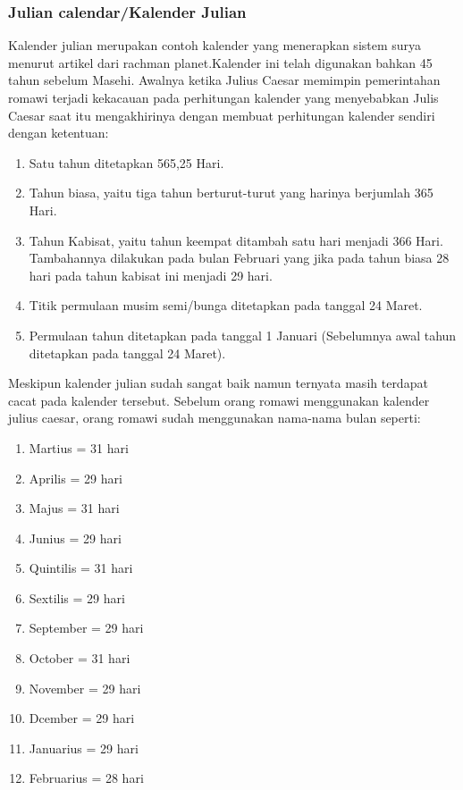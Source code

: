     \subsubsection{Julian calendar/Kalender Julian}
      Kalender julian merupakan contoh kalender yang menerapkan sistem surya menurut artikel dari rachman planet\cite{rachmanplanet}.Kalender ini telah digunakan bahkan 45 tahun sebelum Masehi.
    Awalnya ketika Julius Caesar memimpin pemerintahan romawi terjadi kekacauan  pada perhitungan kalender yang menyebabkan Julis Caesar saat itu mengakhirinya dengan membuat perhitungan kalender sendiri dengan ketentuan:
    \begin{enumerate}
	  \item Satu tahun ditetapkan 565,25 Hari.
      \item Tahun biasa, yaitu tiga tahun berturut-turut yang harinya berjumlah 365 Hari.
      \item Tahun Kabisat, yaitu tahun keempat ditambah satu hari menjadi 366 Hari. Tambahannya dilakukan pada bulan Februari yang jika pada tahun biasa 28 hari pada tahun kabisat ini menjadi 29 hari.
      \item Titik permulaan musim semi/bunga ditetapkan pada tanggal 24 Maret.
      \item Permulaan tahun ditetapkan pada tanggal 1 Januari (Sebelumnya awal tahun ditetapkan pada tanggal 24 Maret).
	\end{enumerate}
    Meskipun kalender julian sudah sangat baik namun ternyata masih terdapat cacat pada kalender tersebut.
    Sebelum orang romawi menggunakan kalender julius caesar, orang romawi sudah menggunakan nama-nama bulan seperti:
    \begin{enumerate}
      \item  Martius     = 31 hari
      \item  Aprilis     = 29 hari
      \item  Majus       = 31 hari
      \item  Junius      = 29 hari
      \item  Quintilis   = 31 hari
      \item  Sextilis    = 29 hari
      \item  September   = 29 hari
      \item  October     = 31 hari
      \item  November    = 29 hari
      \item  Dcember     = 29 hari
      \item  Januarius   = 29 hari
      \item  Februarius  = 28 hari
    \end{enumerate} 

